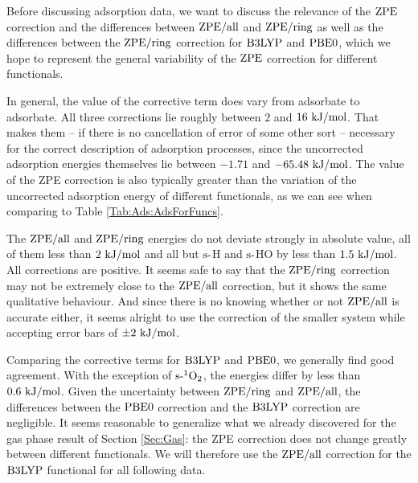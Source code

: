 \documentclass[8.5pt,twoside,twocolumn]{article}
\newcommand\zpe{\enmat{\te{ZPE}}}
\newcommand\zpering{\enmat{\zpe/\te{ring}}}
\newcommand\zpeall{\enmat{\zpe/\te{all}}}
\newcommand\sur{\enmat{\te{s-}}}
\newcommand\kmo{\enmat{\te {kJ/mol}}}
\theoremstyle{standard}
\begin{document}

Before discussing adsorption data, we want to discuss the relevance of the
$\zpe$ correction and the differences between $\zpeall$ and $\zpering$
as well as the differences between the $\zpering$ correction for $\text{B3LYP}$ and
$\text{PBE0}$, which we hope to represent the general variability of the
$\zpe$ correction for different functionals.

In general, the value of the corrective term does vary from
adsorbate to adsorbate. All three corrections lie roughly between $2$
and $16~\kmo$. That makes them -- if there is no cancellation
of error of some other sort -- necessary for the correct description
of adsorption processes, since the uncorrected adsorption energies
themselves lie between $-1.71$ and $-65.48~\kmo$. The value of the 
ZPE correction is also typically greater than the variation of
the uncorrected adsorption energy of different functionals, as we
can see when comparing to Table \ref{Tab:Ads:AdsForFuncs}.

The $\zpeall$ and $\zpering$ energies
do not deviate strongly in absolute value, all of them less than $2~\kmo$
and all but $\sur$H and $\sur$HO by less than $1.5~\kmo$. All corrections are
positive.
It seems safe to say that the $\zpering$ correction may not be extremely
close to the $\zpeall$ correction, but it shows the same qualitative
behaviour. And since there is no knowing whether or not $\zpeall$ is
accurate either, it seems alright to use the correction of the smaller
system while accepting error bars of $\pm 2~\kmo$.

Comparing the corrective terms for $\text{B3LYP}$ and $\text{PBE0}$, we generally find
good agreement. With the exception of $\sur^1\ot$, the energies
differ by less than $0.6~\kmo$.
Given the uncertainty between $\zpering$ and $\zpeall$, the differences
between the  $\text{PBE0}$ correction and the $\text{B3LYP}$ correction are negligible.
It seems reasonable to generalize what we already discovered for the gas
phase result of Section \ref{Sec:Gas}: the ZPE correction does
not change greatly between different functionals. We will therefore
use the $\zpeall$ correction for the $\text{B3LYP}$ functional for all
following data.
\end{document}
